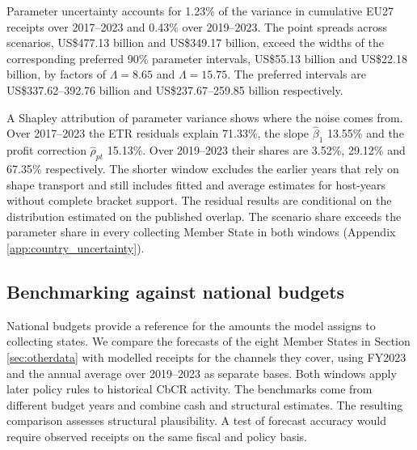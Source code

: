 \documentclass[11pt,a4paper]{article}
\newcommand{\usd}{US\$}
\begin{document}
Parameter uncertainty accounts for 1.23\% of the variance in cumulative EU27 receipts over 2017–2023 and 0.43\% over 2019–2023. The point spreads across scenarios, \usd477.13 billion and \usd349.17 billion, exceed the widths of the corresponding preferred 90\% parameter intervals, \usd55.13 billion and \usd22.18 billion, by factors of $\Lambda=8.65$ and $\Lambda=15.75$. The preferred intervals are \usd337.62–392.76 billion and \usd237.67–259.85 billion respectively.

A Shapley attribution of parameter variance shows where the noise comes from. Over 2017–2023 the ETR residuals explain 71.33\%, the slope $\hat\beta_1$ 13.55\% and the profit correction $\hat\rho_{pt}$ 15.13\%. Over 2019–2023 their shares are 3.52\%, 29.12\% and 67.35\% respectively. The shorter window excludes the earlier years that rely on shape transport and still includes fitted and average estimates for host-years without complete bracket support. The residual results are conditional on the distribution estimated on the published overlap. The scenario share exceeds the parameter share in every collecting Member State in both windows (Appendix \ref{app:country_uncertainty}).

\subsection{Benchmarking against national budgets}\label{sec:backtest}

National budgets provide a reference for the amounts the model assigns to collecting states. We compare the forecasts of the eight Member States in Section \ref{sec:otherdata} with modelled receipts for the channels they cover, using FY2023 and the annual average over 2019–2023 as separate bases. Both windows apply later policy rules to historical CbCR activity. The benchmarks come from different budget years and combine cash and structural estimates. The resulting comparison assesses structural plausibility. A test of forecast accuracy would require observed receipts on the same fiscal and policy basis.


\end{document}
